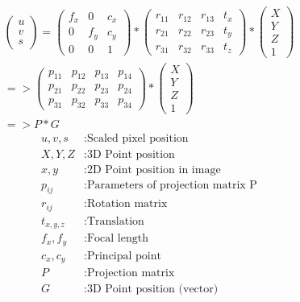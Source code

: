 \documentclass[11pt,a4paper,titlepage,oneside]{report}
\begin{document}
\begin{equation}\label{eq:pe_warped}
  \begin{split}
  \begin{pmatrix}
    u \\
    v \\
    s
  \end{pmatrix}=
  \begin{pmatrix}
    f_x & 0 & c_x \\
    0 & f_y & c_y \\
    0 & 0 & 1
  \end{pmatrix}*
  \begin{pmatrix}
    r_{11} & r_{12} & r_{13} & t_x \\
    r_{21} & r_{22} & r_{23} & t_y \\
    r_{31} & r_{32} & r_{33} & t_z
  \end{pmatrix}*
  \begin{pmatrix}
    X\\
    Y\\
    Z\\
    1
  \end{pmatrix}\\
  =>\begin{pmatrix}
    p_{11} & p_{12} & p_{13} & p_{14} \\
    p_{21} & p_{22} & p_{23} & p_{24} \\
    p_{31} & p_{32} & p_{33} & p_{34}
  \end{pmatrix}*
  \begin{pmatrix}
    X\\
    Y\\
    Z\\
    1
  \end{pmatrix}\\
  =>P*G
\end{split}
\end{equation}
\begin{align*}
  u,v,s     &: \text{Scaled pixel position}\\
  X,Y,Z     &: \text{3D Point position}\\
  x,y       &: \text{2D Point position in image}\\
  p_{ij}    &: \text{Parameters of projection matrix P}\\
  r_{ij}    &: \text{Rotation matrix}\\
  t_{x,y,z} &: \text{Translation}\\
  f_x,f_y   &: \text{Focal length}\\
  c_x,c_y   &: \text{Principal point}\\
  P         &: \text{Projection matrix}\\
  G         &: \text{3D Point position (vector)}
\end{align*}
\end{document}
